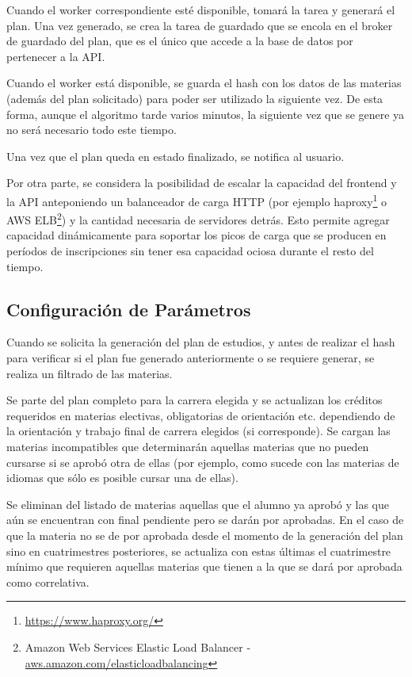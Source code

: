 \documentclass[a4paper]{article}
\begin{document}
Cuando el worker correspondiente esté disponible, tomará la tarea y generará el plan. Una vez generado, se crea la tarea de guardado que se encola en el broker de guardado del plan, que es el único que accede a la base de datos por pertenecer a la API.

Cuando el worker está disponible, se guarda el hash con los datos de las materias (además del plan solicitado) para poder ser utilizado la siguiente vez. De esta forma, aunque el algoritmo tarde varios minutos, la siguiente vez que se genere ya no será necesario todo este tiempo.

Una vez que el plan queda en estado finalizado, se notifica al usuario.\newline

Por otra parte, se considera la posibilidad de escalar la capacidad del frontend y la API anteponiendo un balanceador de carga HTTP (por ejemplo haproxy\footnote{\url{https://www.haproxy.org/}} o AWS ELB\footnote{Amazon Web Services Elastic Load Balancer - \url{aws.amazon.com/elasticloadbalancing}}) y la cantidad necesaria de servidores detrás. Esto permite agregar capacidad dinámicamente para soportar los picos de carga que se producen en períodos de inscripciones sin tener esa capacidad ociosa durante el resto del tiempo. 


\subsection{Configuración de Parámetros}
Cuando se solicita la generación del plan de estudios, y antes de realizar el hash para verificar si el plan fue generado anteriormente o se requiere generar, se realiza un filtrado de las materias.

Se parte del plan completo para la carrera elegida y se actualizan los créditos requeridos en materias electivas, obligatorias de orientación etc. dependiendo de la orientación y trabajo final de carrera elegidos (si corresponde). Se cargan las materias incompatibles que determinarán aquellas materias que no pueden cursarse si se aprobó otra de ellas (por ejemplo, como sucede con las materias de idiomas que sólo es posible cursar una de ellas).

Se eliminan del listado de materias aquellas que el alumno ya aprobó y las que aún se encuentran con final pendiente pero se darán por aprobadas. En el caso de que la materia no se de por aprobada desde el momento de la generación del plan sino en cuatrimestres posteriores, se actualiza con estas últimas el cuatrimestre mínimo que requieren aquellas materias que tienen a la que se dará por aprobada como correlativa.
\end{document}
